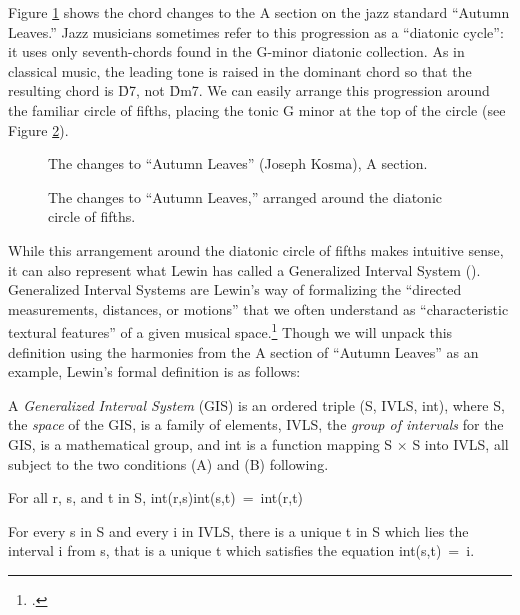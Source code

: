Figure \ref{ds:autumn-leaves-changes} shows the chord changes to the A section
on the jazz standard “Autumn Leaves.” Jazz musicians sometimes refer
to this progression as a “diatonic cycle”: it uses only seventh-chords found
in the G-minor diatonic collection. As in classical music, the leading
tone is raised in the dominant chord so that the resulting chord is \h{D7}, not
\h{Dm7}. We can easily arrange this progression around the familiar
circle of fifths, placing the tonic G minor at the top of the circle (see
Figure \ref{ds:circle-of-fifths}).

\begin{figure}[thbp]
  \caption{The changes to “Autumn Leaves” (Joseph Kosma), A section.}
  \label{ds:autumn-leaves-changes}
\end{figure}

\begin{figure}[htbp]
  \caption{The changes to “Autumn Leaves,” arranged around the diatonic circle
    of fifths.}
  \label{ds:circle-of-fifths}
\end{figure}

While this arrangement around the diatonic circle of fifths makes intuitive
sense, it can also represent what Lewin has called a Generalized Interval System
(\gis{}). Generalized Interval Systems are Lewin’s way of formalizing the
“directed measurements, distances, or motions” that we often understand as
“characteristic textural features” of a given musical
space.\footcite[16]{lewin:gmit} Though we will unpack this definition using
the harmonies from the A section of “Autumn Leaves” as an example, Lewin’s
formal definition is as follows:
\begin{quoting}
  \singlespacing
  A \emph{Generalized Interval System} (GIS) is an ordered triple (S, IVLS,
  int), where S, the \emph{space} of the GIS, is a family of elements, IVLS,
  the \emph{group of intervals} for the GIS, is a mathematical group, and int
  is a function mapping S $\times$ S into IVLS, all subject to the two
  conditions (A) and (B) following.
  \begin{compactenum}[(A): ]
    \item For all r, s, and t in S, \mbox{int(r,s)int(s,t) = int(r,t)}
    \item For every s in S and every i in IVLS, there is a unique t in S which
      lies the interval i from s, that is a unique t which satisfies the
      equation \mbox{int(s,t) = i}.
  \end{compactenum}
\end{quoting}

